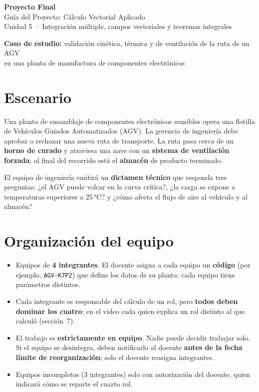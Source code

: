 \documentclass[11pt,letterpaper]{article}
\newcommand{\dest}[1]{\textcolor{accentcolor}{\textbf{#1}}}
\begin{document}
\begin{center}
{\LARGE\bfseries\color{tecnmblue} Proyecto Final}\\[3pt]
{\large Guía del Proyecto: Cálculo Vectorial Aplicado}\\[3pt]
{\normalsize Unidad 5 · Integración múltiple, campos vectoriales y teoremas integrales}\\[8pt]
\colorbox{softblue}{\parbox{0.92\linewidth}{\centering\small
\textbf{Caso de estudio:} validación cinética, térmica y de ventilación de la ruta de un AGV\\
en una planta de manufactura de componentes electrónicos}}
\end{center}

\section{Escenario}
Una planta de ensamblaje de componentes electrónicos sensibles opera una flotilla de Vehículos Guiados Automatizados (AGV). La gerencia de ingeniería debe aprobar o rechazar una nueva ruta de transporte. La ruta pasa cerca de un \textbf{horno de curado} y atraviesa una nave con un \textbf{sistema de ventilación forzada}; al final del recorrido está el \textbf{almacén} de producto terminado.

El equipo de ingeniería emitirá un \textbf{dictamen técnico} que responda tres preguntas: ¿el AGV puede volcar en la curva crítica?, ¿la carga se expone a temperaturas superiores a 25\,°C? y ¿cómo afecta el flujo de aire al vehículo y al almacén?

\section{Organización del equipo}
\begin{itemize}
\item Equipos de \textbf{4 integrantes}. El docente asigna a cada equipo un \textbf{código} (por ejemplo, \texttt{AGV-K7P2}) que define los datos de su planta: cada equipo tiene parámetros distintos.
\item Cada integrante es responsable del cálculo de un rol, pero \textbf{todos deben dominar los cuatro}: en el video cada quien explica un rol distinto al que calculó (sección~7).
\item El trabajo es \dest{estrictamente en equipo}. Nadie puede decidir trabajar solo. Si el equipo se desintegra, deben notificarlo al docente \textbf{antes de la fecha límite de reorganización}; solo el docente reasigna integrantes.
\item Equipos incompletos (3 integrantes) solo con autorización del docente, quien indicará cómo se reparte el cuarto rol.
\end{itemize}
\end{document}
